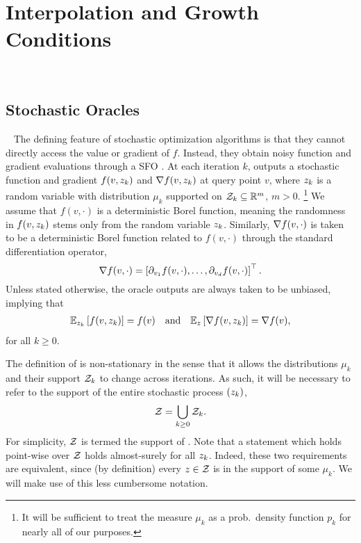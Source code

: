 
\chapter{Interpolation and Growth Conditions}~\label{ch:interpolation-gc}



\section{Stochastic Oracles}~\label{sec:stochastic-oracles}
The defining feature of stochastic optimization algorithms is that they cannot directly access the value or gradient of \( f \).
Instead, they obtain noisy function and gradient evaluations through a \ac{SFO}  \oracle. 
At each iteration \( k \), \oracle{} outputs a stochastic function and gradient \( f(v, z_{k}) \) and \( \nabla f(v, z_{k}) \) at query point \( v \), where \( z_{k} \) is a random variable with distribution \( \mu_k \) supported on \( \mathcal{Z}_k \subseteq \mathbb{R}^m \), \( m > 0 \).%
\footnote{It will be sufficient to treat the measure \( \mu_k \) as a prob.\ density function \( p_k \) for nearly all of our purposes.}
We assume that \( f(v, \cdot) \) is a deterministic Borel function, meaning the randomness in \( f(v, z_{k}) \) stems only from the random variable \( z_{k} \).
Similarly, \( \nabla f(v, \cdot) \) is taken to be a deterministic Borel function related to \( f(v, \cdot) \) through the standard differentiation operator,
\[ \nabla f(v, \cdot) = \left[\partial_{v_1} f(v, \cdot), \ldots, \partial_{v_d} f(v, \cdot)\right]^\top. \]
Unless stated otherwise, the oracle outputs are always taken to be unbiased, implying that 
\begin{align*}
    \mathbb{E}_{z_{k}} \left[f(v, z_{k})\right] = f(v) \quad \text{and} \quad \mathbb{E}_{z} \left[\nabla f(v, z_{k})\right] = \nabla f(v), 
\end{align*}
for all \( k \geq 0 \).

The definition of \oracle{} is non-stationary in the sense that it allows the distributions \( \mu_k \) and their support \( \mathcal{Z}_k \) to change across iterations.
As such, it will be necessary to refer to the support of the entire stochastic process \( \left(z_{k}\right) \), 
\[ \mathcal{Z} = \bigcup_{k\geq 0} \mathcal{Z}_k. \]
For simplicity, \( \mathcal{Z} \) is termed the support of \oracle{}. 
Note that a statement which holds point-wise over \( \mathcal{Z} \) holds almost-surely for all \( z_{k} \).
Indeed, these two requirements are equivalent, since (by definition) every \( z \in \mathcal{Z} \) is in the support of some \( \mu_k \).
We will make use of this less cumbersome notation. 

